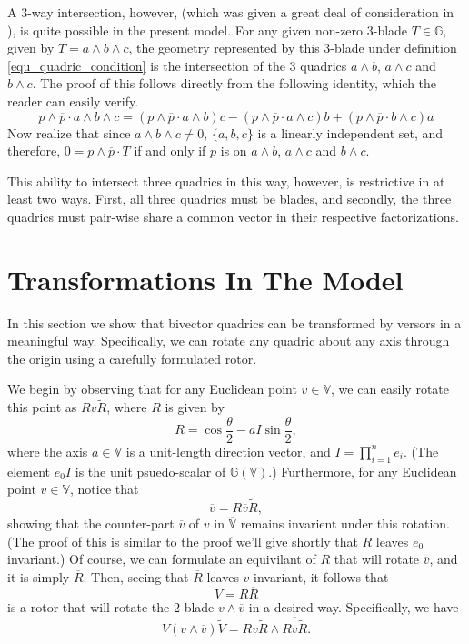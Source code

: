 \documentclass{birkjour}
\theoremstyle{definition}
\theoremstyle{remark}
\numberwithin{equation}{section}
\newcommand{\G}{\mathbb{G}}
\newcommand{\V}{\mathbb{V}}
\begin{document}
A 3-way intersection, however, (which was given a great deal of consideration in \cite{ZhiqiangXu05}), is
quite possible in the present model.
For any given non-zero 3-blade $T\in\G$, given by $T=a\wedge b\wedge c$, the
geometry represented by this 3-blade under definition \eqref{equ_quadric_condition} is the intersection
of the 3 quadrics $a\wedge b$, $a\wedge c$ and $b\wedge c$.
The proof of this follows directly from the following identity, which the reader can easily verify.
\begin{equation}
p\wedge\overline{p}\cdot a\wedge b\wedge c
 = (p\wedge\overline{p}\cdot a\wedge b)c
 - (p\wedge\overline{p}\cdot a\wedge c)b
 + (p\wedge\overline{p}\cdot b\wedge c)a
\end{equation}
Now realize that since $a\wedge b\wedge c\neq 0$, $\{a,b,c\}$ is a linearly
independent set, and therefore, $0=p\wedge\overline{p}\cdot T$ if and
only if $p$ is on $a\wedge b$, $a\wedge c$ and $b\wedge c$.

This ability to intersect three quadrics in this way, however, is restrictive in at least
two ways.  First, all three quadrics must be blades, and secondly, the
three quadrics must pair-wise share a common vector in their respective factorizations.

\section{Transformations In The Model}

In this section we show that bivector quadrics can be transformed by
versors in a meaningful way.  Specifically, we can rotate any quadric about
any axis through the origin using a carefully formulated rotor.

We begin by observing that for any Euclidean point $v\in\V$,
we can easily rotate this point as $Rv\tilde{R}$, where $R$ is
given by
\begin{equation}
R = \cos\frac{\theta}{2} - aI\sin\frac{\theta}{2},
\end{equation}
where the axis $a\in\V$ is a unit-length direction vector, and $I=\prod_{i=1}^n e_i$.
(The element $e_0I$ is the unit psuedo-scalar of $\G(\V)$.)
Furthermore, for any Euclidean point $v\in\V$, notice that
\begin{equation}
\overline{v} = R\overline{v}\tilde{R},
\end{equation}
showing that the counter-part $\overline{v}$ of $v$ in $\overline{\V}$ remains invarient
under this rotation.  (The proof of this is similar to the proof we'll give
shortly that $R$ leaves $e_0$ invariant.)  Of course, we can formulate an equivilant of $R$
that will rotate $\overline{v}$, and it is simply $\overline{R}$.  Then, seeing
that $\overline{R}$ leaves $v$ invariant, it follows that
\begin{equation}\label{equ_rotation_versor}
V=R\overline{R}
\end{equation}
is a rotor that will rotate the 2-blade
$v\wedge\overline{v}$ in a desired way.  Specifically, we have
\begin{equation}
V(v\wedge\overline{v})\tilde{V} = Rv\tilde{R}\wedge\overline{Rv\tilde{R}}.
\end{equation}
\end{document}
